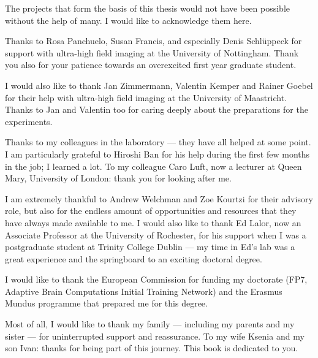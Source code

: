 

\begin{acknowledgements}      %

  The projects that form the basis of this thesis would not have been possible without the help of many. I would like to acknowledge them here. 

  Thanks to Rosa Panchuelo, Susan Francis, and especially Denis Schl\"{u}ppeck for support with ultra-high field imaging at the University of Nottingham. Thank you also for your patience towards an overexcited first year graduate student.

  I would also like to thank Jan Zimmermann, Valentin Kemper and Rainer Goebel for their help with ultra-high field imaging at the University of Maastricht. Thanks to Jan and Valentin too for caring deeply about the preparations for the experiments.

  Thanks to my colleagues in the laboratory --- they have all helped at some point. I am particularly grateful to Hiroshi Ban for his help during the first few months in the job; I learned a lot. To my colleague Caro Luft, now a lecturer at Queen Mary, University of London: thank you for looking after me.

  I am extremely thankful to Andrew Welchman and Zoe Kourtzi for their advisory role, but also for the endless amount of opportunities and resources that they have always made available to me. I would also like to thank Ed Lalor, now an Associate Professor at the University of Rochester, for his support when I was a postgraduate student at Trinity College Dublin --- my time in Ed's lab was a great experience and the springboard to an exciting doctoral degree.
  
  I would like to thank the European Commission for funding my doctorate (FP7, Adaptive Brain Computations Initial Training Network) and the Erasmus Mundus programme that prepared me for this degree.

  Most of all, I would like to thank my family --- including my parents and my sister --- for uninterrupted support and reassurance. To my wife Ksenia and my son Ivan: thanks for being part of this journey. This book is dedicated to you.

\end{acknowledgements}


